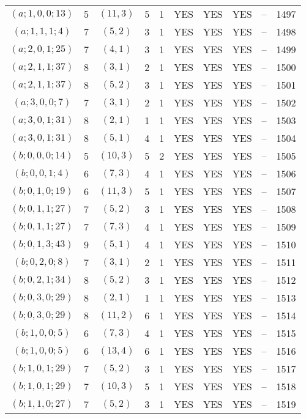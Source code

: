 \begin{longtable}{|c|c|c|c|c|c|c|c|c|c|}
$(a; 1, 0, 0; 13)$ & 5 & $(11, 3)$ & 5 & 1 & YES & YES & YES & -- & 1497\\
$(a; 1, 1, 1; 4)$ & 7 & $(5, 2)$ & 3 & 1 & YES & YES & YES & -- & 1498\\
$(a; 2, 0, 1; 25)$ & 7 & $(4, 1)$ & 3 & 1 & YES & YES & YES & -- & 1499\\
$(a; 2, 1, 1; 37)$ & 8 & $(3, 1)$ & 2 & 1 & YES & YES & YES & -- & 1500\\
$(a; 2, 1, 1; 37)$ & 8 & $(5, 2)$ & 3 & 1 & YES & YES & YES & -- & 1501\\
$(a; 3, 0, 0; 7)$ & 7 & $(3, 1)$ & 2 & 1 & YES & YES & YES & -- & 1502\\
$(a; 3, 0, 1; 31)$ & 8 & $(2, 1)$ & 1 & 1 & YES & YES & YES & -- & 1503\\
$(a; 3, 0, 1; 31)$ & 8 & $(5, 1)$ & 4 & 1 & YES & YES & YES & -- & 1504\\
$(b; 0, 0, 0; 14)$ & 5 & $(10, 3)$ & 5 & 2 & YES & YES & YES & -- & 1505\\
$(b; 0, 0, 1; 4)$ & 6 & $(7, 3)$ & 4 & 1 & YES & YES & YES & -- & 1506\\
$(b; 0, 1, 0; 19)$ & 6 & $(11, 3)$ & 5 & 1 & YES & YES & YES & -- & 1507\\
$(b; 0, 1, 1; 27)$ & 7 & $(5, 2)$ & 3 & 1 & YES & YES & YES & -- & 1508\\
$(b; 0, 1, 1; 27)$ & 7 & $(7, 3)$ & 4 & 1 & YES & YES & YES & -- & 1509\\
$(b; 0, 1, 3; 43)$ & 9 & $(5, 1)$ & 4 & 1 & YES & YES & YES & -- & 1510\\
$(b; 0, 2, 0; 8)$ & 7 & $(3, 1)$ & 2 & 1 & YES & YES & YES & -- & 1511\\
$(b; 0, 2, 1; 34)$ & 8 & $(5, 2)$ & 3 & 1 & YES & YES & YES & -- & 1512\\
$(b; 0, 3, 0; 29)$ & 8 & $(2, 1)$ & 1 & 1 & YES & YES & YES & -- & 1513\\
$(b; 0, 3, 0; 29)$ & 8 & $(11, 2)$ & 6 & 1 & YES & YES & YES & -- & 1514\\
$(b; 1, 0, 0; 5)$ & 6 & $(7, 3)$ & 4 & 1 & YES & YES & YES & -- & 1515\\
$(b; 1, 0, 0; 5)$ & 6 & $(13, 4)$ & 6 & 1 & YES & YES & YES & -- & 1516\\
$(b; 1, 0, 1; 29)$ & 7 & $(5, 2)$ & 3 & 1 & YES & YES & YES & -- & 1517\\
$(b; 1, 0, 1; 29)$ & 7 & $(10, 3)$ & 5 & 1 & YES & YES & YES & -- & 1518\\
$(b; 1, 1, 0; 27)$ & 7 & $(5, 2)$ & 3 & 1 & YES & YES & YES & -- & 1519\\

\end{longtable}
